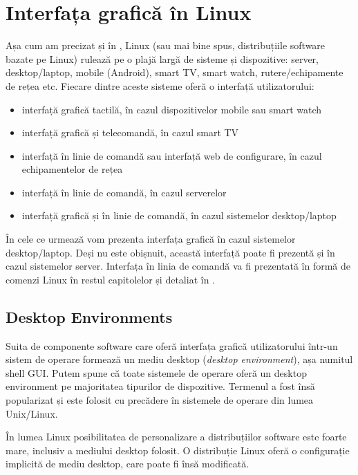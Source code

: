 \section{Interfața grafică în Linux}
\label{sec:ui:linux-gui}

Așa cum am precizat și în , Linux (sau mai bine spus, distribuțiile software bazate pe Linux) rulează pe o plajă largă de sisteme și dispozitive: server, desktop/laptop, mobile (Android), smart TV, smart watch, rutere/echipamente de rețea etc. Fiecare dintre aceste sisteme oferă o interfață utilizatorului:

\begin{itemize}
  \item interfață grafică tactilă, în cazul dispozitivelor mobile sau smart watch
  \item interfață grafică și telecomandă, în cazul smart TV
  \item interfață în linie de comandă sau interfață web de configurare, în cazul echipamentelor de rețea
  \item interfață în linie de comandă, în cazul serverelor
  \item interfață grafică și în linie de comandă, în cazul sistemelor desktop/laptop
\end{itemize}

În cele ce urmează vom prezenta interfața grafică în cazul sistemelor desktop/laptop. Deși nu este obișnuit, această interfață poate fi prezentă și în cazul sistemelor server. Interfața în linia de comandă va fi prezentată în formă de comenzi Linux în restul capitolelor și detaliat în .

\subsection{Desktop Environments}
\label{sec:ui:desktop-environments}

Suita de componente software care oferă interfața grafică utilizatorului într-un sistem de operare formează un mediu desktop (\textit{desktop environment}), așa numitul shell GUI. Putem spune că toate sistemele de operare oferă un desktop environment pe majoritatea tipurilor de dispozitive. Termenul a fost însă popularizat și este folosit cu precădere în sistemele de operare din lumea Unix/Linux.

În lumea Linux posibilitatea de personalizare a distribuțiilor software este foarte mare, inclusiv a mediului desktop folosit. O distribuție Linux oferă o configurație implicită de mediu desktop, care poate fi însă modificată.

